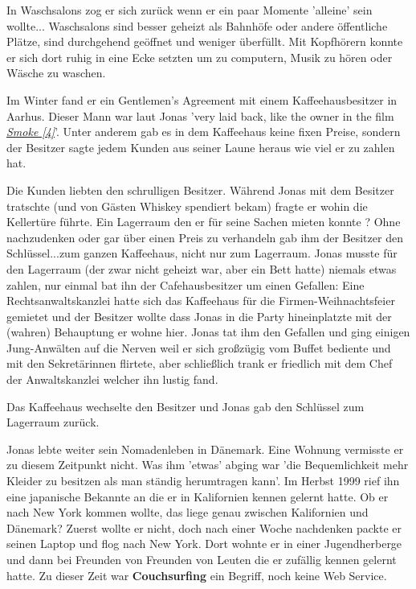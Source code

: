 In Waschsalons zog er sich zurück wenn er ein paar Momente 'alleine' sein wollte... Waschsalons sind besser geheizt als Bahnhöfe oder andere öffentliche Plätze, sind durchgehend geöffnet und weniger überfüllt. Mit Kopfhörern konnte er sich dort ruhig in eine Ecke setzten um zu computern, Musik zu hören oder Wäsche zu waschen.

Im Winter fand er ein Gentlemen’s Agreement mit einem Kaffeehausbesitzer in Aarhus. Dieser Mann war laut Jonas 'very laid back, like the owner in the film \href{http://goo.gl/9ENgMR}{\textit{Smoke [4]}}'. Unter anderem gab es in dem Kaffeehaus keine fixen Preise, sondern der Besitzer sagte jedem Kunden aus seiner Laune heraus wie viel er zu zahlen hat. 

Die Kunden liebten den schrulligen Besitzer. Während Jonas mit dem Besitzer tratschte (und von Gästen Whiskey spendiert bekam) fragte er wohin die Kellertüre führte. Ein Lagerraum den er für seine Sachen mieten konnte ? Ohne nachzudenken oder gar über einen Preis zu verhandeln gab ihm der Besitzer den Schlüssel...zum ganzen Kaffeehaus, nicht nur zum Lagerraum. Jonas musste für den Lagerraum (der zwar nicht geheizt war, aber ein Bett hatte) niemals etwas zahlen, nur einmal bat ihn der Cafehausbesitzer um einen Gefallen:
Eine Rechtsanwaltskanzlei hatte sich das Kaffeehaus für die Firmen-Weihnachtsfeier gemietet und der Besitzer wollte dass Jonas in die Party hineinplatzte mit der (wahren) Behauptung er wohne hier. 
Jonas tat ihm den Gefallen und ging einigen Jung-Anwälten auf die Nerven weil er sich großzügig vom Buffet bediente und mit den Sekretärinnen flirtete, aber schließlich trank er friedlich mit dem Chef der Anwaltskanzlei welcher ihn lustig fand.

Das Kaffeehaus wechselte den Besitzer und Jonas gab den Schlüssel zum Lagerraum zurück. 

Jonas lebte weiter sein Nomadenleben in Dänemark. Eine Wohnung vermisste er zu diesem Zeitpunkt nicht. Was ihm 'etwas' abging war 'die Bequemlichkeit mehr Kleider zu besitzen als man ständig herumtragen kann'. Im Herbst 1999 rief ihn eine japanische Bekannte an die er in Kalifornien kennen gelernt hatte. Ob er nach New York kommen wollte, das liege genau zwischen Kalifornien und Dänemark? Zuerst wollte er nicht, doch nach einer Woche nachdenken packte er seinen Laptop und flog nach New York. Dort wohnte er in einer Jugendherberge und dann bei Freunden von Freunden von Leuten die er zufällig kennen gelernt hatte. Zu dieser Zeit war \textbf{Couchsurfing} ein Begriff, noch keine Web Service.

